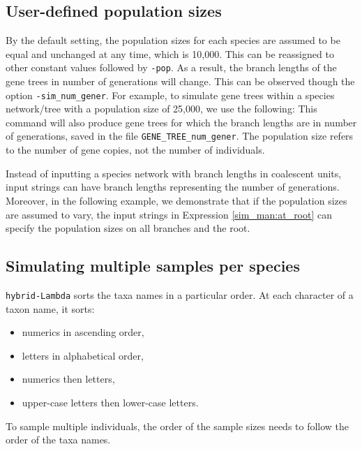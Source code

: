 \subsection{User-defined population sizes}\label{sim_man:pop}
By the default setting, the population sizes for each species are assumed to be equal and unchanged at any time, which is 10,000. This can be reassigned to other constant values followed by {\tt -pop}. As a result, the branch lengths of the gene trees in number of generations will change. This can be observed though the option {\tt -sim\_num\_gener}. For example, to simulate gene trees within a species network/tree with a population size of 25,000,
we use the following:
This command will also produce gene trees for which the branch lengths are in number of generations, saved in the file {\tt GENE\_TREE\_num\_gener}.
\newline{} The population size refers to the number of gene copies, not the number of individuals.

Instead of inputting a species network with branch lengths in coalescent units, input strings can have branch lengths representing the number of generations.
Moreover, in the following example, we demonstrate that if the population sizes are assumed to vary, the input strings in Expression \eqref{sim_man:at_root} can specify the population sizes on all branches and the root.

\subsection{Simulating multiple samples per species}
{\tt hybrid-Lambda} sorts the taxa names in a particular order. At each character of a taxon name, it sorts:
\begin{itemize}
\item numerics in ascending order,
\item letters in alphabetical order,
\item numerics then letters,
\item upper-case letters then lower-case letters.
\end{itemize}
To sample multiple individuals, the order of the sample sizes needs to follow the order of the taxa names.

